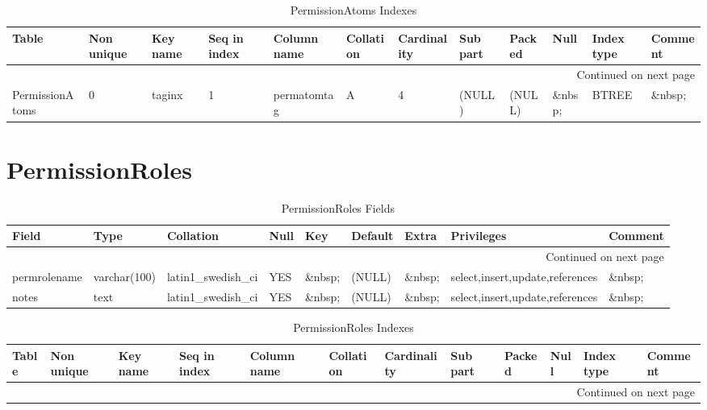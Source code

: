 \documentclass[tablesignature,landscape]{scrartcl}
\begin{document}
\begin{longtable}{|l|l|l|l|l|l|l|l|l|l|l|l|}
\caption{PermissionAtoms Indexes} \label{tbl:permissionatomsindexes}\\
\hline
 Table            &  Non unique  &  Key name  &  Seq in index  &  Column name  &  Collation  &  Cardinality  &  Sub part  &  Packed  &  Null     &  Index type  &  Comment \\
\hline
\endhead
\hline\multicolumn{12}{r}{Continued on next page}\
\endfoot
\endlastfoot
\hline
 PermissionAtoms  &           0  &  PRIMARY   &             1  &  permatomid   &  A          &            4  &  (NULL)    &  (NULL)  &  \&nbsp;  &  BTREE       &  \&nbsp;  \\
 PermissionAtoms  &           0  &  taginx    &             1  &  permatomtag  &  A          &            4  &  (NULL)    &  (NULL)  &  \&nbsp;  &  BTREE       &  \&nbsp;  \\
\hline
\end{longtable}
\section{PermissionRoles}
\label{sec-14}


\begin{longtable}{|l|l|l|l|l|l|l|l|l|}
\caption{PermissionRoles Fields} \label{tbl:permissionrolesfields}\\
\hline
 Field         &  Type          &  Collation                &  Null     &  Key      &  Default  &  Extra              &  Privileges                       &  Comment \\
\hline
\endhead
\hline\multicolumn{9}{r}{Continued on next page}\
\endfoot
\endlastfoot
\hline
 permroleid    &  int(11)       &  NULL                     &  \&nbsp;  &  PRI      &  (NULL)   &  auto\_{}increment  &  select,insert,update,references  &  \&nbsp;  \\
 permrolename  &  varchar(100)  &  latin1\_{}swedish\_{}ci  &  YES      &  \&nbsp;  &  (NULL)   &  \&nbsp;            &  select,insert,update,references  &  \&nbsp;  \\
 notes         &  text          &  latin1\_{}swedish\_{}ci  &  YES      &  \&nbsp;  &  (NULL)   &  \&nbsp;            &  select,insert,update,references  &  \&nbsp;  \\
\hline
\end{longtable}


\begin{longtable}{|l|l|l|l|l|l|l|l|l|l|l|l|}
\caption{PermissionRoles Indexes} \label{tbl:permissionrolesindexes}\\
\hline
 Table            &  Non unique  &  Key name  &  Seq in index  &  Column name  &  Collation  &  Cardinality  &  Sub part  &  Packed  &  Null     &  Index type  &  Comment \\
\hline
\endhead
\hline\multicolumn{12}{r}{Continued on next page}\
\endfoot
\endlastfoot
\hline
 PermissionRoles  &           0  &  PRIMARY   &             1  &  permroleid   &  A          &            3  &  (NULL)    &  (NULL)  &  \&nbsp;  &  BTREE       &  \&nbsp;  \\
\hline
\end{longtable}
\end{document}
